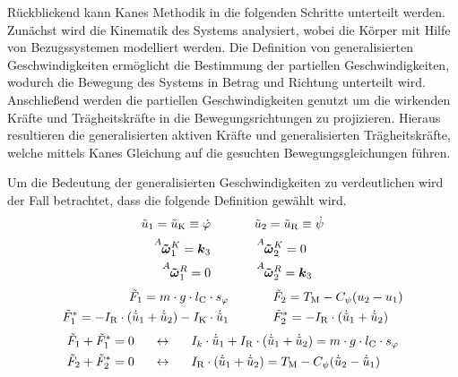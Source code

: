Rückblickend kann Kanes Methodik in die folgenden Schritte unterteilt werden. Zunächst wird die Kinematik des Systems analysiert, wobei die Körper mit Hilfe von Bezugssystemen modelliert werden. Die Definition von generalisierten Geschwindigkeiten ermöglicht die Bestimmung der partiellen Geschwindigkeiten, wodurch die Bewegung des Systems in Betrag und Richtung unterteilt wird. Anschließend werden die partiellen Geschwindigkeiten genutzt um die wirkenden Kräfte und Trägheitskräfte in die Bewegungsrichtungen zu projizieren. Hieraus resultieren die generalisierten aktiven Kräfte und generalisierten Trägheitskräfte, welche mittels Kanes Gleichung auf die gesuchten Bewegungsgleichungen führen.

Um die Bedeutung der generalisierten Geschwindigkeiten zu verdeutlichen wird der Fall betrachtet, dass die folgende Definition gewählt wird.
\begin{equation}
\tilde{u}_{\text{1}} = \tilde{u}_{\text{K}} \equiv \dot{\varphi} \hspace{35pt} \tilde{u}_{\text{2}} = \tilde{u}_{\text{R}} \equiv \dot{\psi}
\end{equation}
\begin{equation}
\begin{split}
\vel{A}{\tilde{\omega}}{K}\idx{1} = \bs{k}\idx{3} &\hspace{35pt} \vel{A}{\tilde{\omega}}{K}\idx{2} = 0
\\
\vel{A}{\tilde{\omega}}{R}\idx{1} = 0 &\hspace{35pt} \vel{A}{\tilde{\omega}}{R}\idx{2} = \bs{k}\idx{3}
\end{split}
\end{equation}
\begin{equation}
\begin{split}
\tilde{F}_{\text{1}} = m\cdot g\cdot l_{\text{C}}\cdot s_{\varphi} &\hspace{35pt} \tilde{F}_{\text{2}} = T_{\text{M}} - C_{\psi}(u_{\text{2}}-u_{\text{1}}) 
\\
\tilde{F}^*_{\text{1}} = -I_{\text{R}}\cdot (\dot{\tilde{u}}_{\text{1}} + \dot{\tilde{u}}_{\text{2}}) - I_{\text{K}}\cdot \dot{\tilde{u}}_{\text{1}} &\hspace{35pt} \tilde{F}^*_{\text{2}} = -I_{\text{R}}\cdot (\dot{\tilde{u}}_{\text{1}} + \dot{\tilde{u}}_{\text{2}})
\end{split}
\end{equation}
\begin{align}
\tilde{F}_{\text{1}} + \tilde{F}^*_{\text{1}} = 0 &\hspace{15pt}\leftrightarrow\hspace{15pt} I_k\cdot \dot{\tilde{u}}_{\text{1}} + I_{\text{R}}\cdot (\dot{\tilde{u}}_{\text{1}}+\dot{\tilde{u}}_{\text{2}}) = m\cdot g\cdot l_{\text{C}}\cdot s_{\varphi} \label{tilde_bwg_1}
\\
\tilde{F}_{\text{2}} + \tilde{F}^*_{\text{2}} = 0 &\hspace{15pt}\leftrightarrow\hspace{15pt} I_{\text{R}}\cdot (\dot{\tilde{u}}_{\text{1}}+\dot{\tilde{u}}_{\text{2}}) = T_{\text{M}} - C_{\psi}(\dot{\tilde{u}}_{\text{2}} - \dot{\tilde{u}}_{\text{1}}) \label{tilde_bwg_2}
\end{align}
